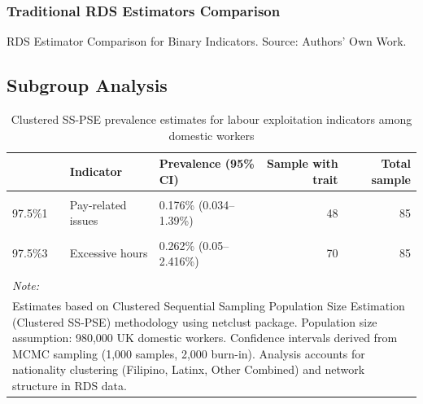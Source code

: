 \documentclass[
  12pt,
  letterpaper,
  DIV=11,
  numbers=noendperiod]{scrartcl}
\theoremstyle{plain}
\theoremstyle{definition}
\begin{document}
\subsubsection{Traditional RDS Estimators
Comparison}\label{traditional-rds-estimators-comparison}

\begin{table}

\caption{\label{tbl-rds-comparison}RDS Estimator Comparison for Binary
Indicators. Source: Authors' Own Work.}


\end{table}%

\subsection{Subgroup Analysis}\label{subgroup-analysis}

\begin{longtable}[t]{lllrr}
\caption{\label{tab:netclust-analysis2}Clustered SS-PSE prevalence estimates for labour exploitation indicators among domestic workers}\\
\toprule
 & Indicator & Prevalence (95\% CI) & Sample with trait & Total sample\\
\midrule
\cellcolor{gray!10}{97.5\%} & \cellcolor{gray!10}{Document withholding} & \cellcolor{gray!10}{0.077\% (0.016–0.731\%)} & \cellcolor{gray!10}{22} & \cellcolor{gray!10}{85}\\
97.5\%1 & Pay-related issues & 0.176\% (0.034–1.39\%) & 48 & 85\\
\cellcolor{gray!10}{97.5\%2} & \cellcolor{gray!10}{Threats/abuse} & \cellcolor{gray!10}{0.212\% (0.047–1.746\%)} & \cellcolor{gray!10}{51} & \cellcolor{gray!10}{85}\\
97.5\%3 & Excessive hours & 0.262\% (0.05–2.416\%) & 70 & 85\\
\cellcolor{gray!10}{97.5\%4} & \cellcolor{gray!10}{Limited access to help} & \cellcolor{gray!10}{0.135\% (0.032–1.435\%)} & \cellcolor{gray!10}{49} & \cellcolor{gray!10}{85}\\
\bottomrule
\multicolumn{5}{l}{\rule{0pt}{1em}\textit{Note: }}\\
\multicolumn{5}{l}{\rule{0pt}{1em}Estimates based on Clustered Sequential Sampling Population Size Estimation (Clustered SS-PSE) methodology using netclust package. Population size assumption: 980,000 UK domestic workers. Confidence intervals derived from MCMC sampling (1,000 samples, 2,000 burn-in). Analysis accounts for nationality clustering (Filipino, Latinx, Other Combined) and network structure in RDS data.}\\
\end{longtable}
\end{document}
